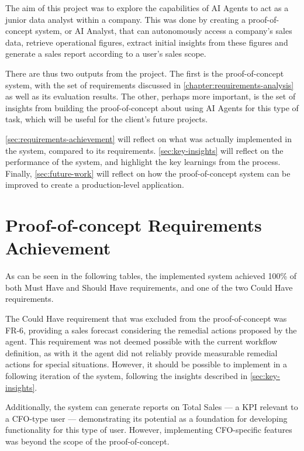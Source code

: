 \documentclass[a4paper]{report}
\begin{document}
The aim of this project was to explore the capabilities of AI Agents to act as a junior data analyst within a company. This was done by creating a proof-of-concept system, or AI Analyst, that can autonomously access a company's sales data, retrieve operational figures, extract initial insights from these figures and generate a sales report according to a user's sales scope.

There are thus two outputs from the project. The first is the proof-of-concept system, with the set of requirements discussed in \autoref{chapter:requirements-analysis} as well as its evaluation results. The other, perhaps more important, is the set of insights from building the proof-of-concept about using AI Agents for this type of task, which will be useful for the client's future projects.

\autoref{sec:requirements-achievement} will reflect on what was actually implemented in the system, compared to its requirements. \autoref{sec:key-insights} will reflect on the performance of the system, and highlight the key learnings from the process. Finally, \autoref{sec:future-work} will reflect on how the proof-of-concept system can be improved to create a production-level application.

\section{Proof-of-concept Requirements Achievement}
\label{sec:requirements-achievement}

As can be seen in the following tables, the implemented system achieved 100\% of both Must Have and Should Have requirements, and one of the two Could Have requirements.

The Could Have requirement that was excluded from the proof-of-concept was FR-6, providing a sales forecast considering the remedial actions proposed by the agent. This requirement was not deemed possible with the current workflow definition, as with it the agent did not reliably provide measurable remedial actions for special situations. However, it should be possible to implement in a following iteration of the system, following the insights described in \autoref{sec:key-insights}.

Additionally, the system can generate reports on Total Sales --- a KPI relevant to a CFO-type user --- demonstrating its potential as a foundation for developing functionality for this type of user. However, implementing CFO-specific features was beyond the scope of the proof-of-concept.
\end{document}
